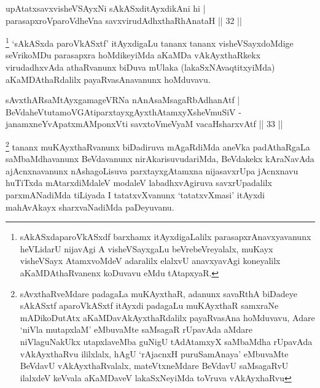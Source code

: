 
\begin{shl}
upAtatxsavxvisheVSAyxNi sAkASxditAyxdikAni hi |\\
parasapxroVparoVdheVna savxvirudAdhxthaRhAnataH \hfill || 32 ||
\end{shl}

\begin{artha}
\footnote[4]{sAkASxdaparoVkASxdf barxhamx itAyxdigaLalilx parasapxrAnavxyavanunx heVLidarU nijavAgi A visheVSayxgaLu beVrebeVreyalalx, muKayx visheVSayx AtamxvoMdeV adaralilx elalxvU anavxyavAgi koneyalilx aKaMDAthaRvanenx koDuvavu eMdu tAtapxyaR.} `sAkASxda paroVkASxtf' itAyxdigaLu tananx tananx visheVSayxdoMdige seVrikoMDu parasapxra hoMdikeyiMda aKaMDa vAkAyxthaRkekx virudadhxvAda athaRvanunx biDuva mUlaka (lakaSxNAvaqtitxyiMda) aKaMDAthaRdalilx payaRvasAnavanunx hoMduvavu.
\end{artha}


\begin{shl}
sAvxthARsaMtAyxgamageVRNa nAnAsaMsagaRbAdhanAtf |\\
BeVdaheVtutamoVGAtiparxtayxgAyxthAtamxyXsheVmuSiV -\\
 janamxneYvA\s \s patxmAMponxVti savxtoV\s meVyaM vacaHsharxvAtf \hfill || 33 || 
\end{shl}

\begin{artha}
\footnote[1]{sAvxthaRveMdare padagaLa muKAyxthaR, adanunx savaRthA biDadeye sAkASxtf aparoVkASxtf itAyxdi padagaLu muKAyxthaR samxraNe mADikoDutAtx aKaMDavAkAyxthaRdalilx payaRvasAna hoMduvavu, Adare `niVla mutapxlaM' eMbuvaMte saMsagaR rUpavAda aMdare niVlaguNakUkx utapxlaveMba guNigU tAdAtamxyX saMbaMdha rUpavAda vAkAyxthaRvu ililxlalx, hAgU `rAjacnxH puruSamAnaya' eMbuvaMte BeVdavU vAkAyxthaRvalalx, mateVtxneMdare BeVdavU saMsagaRvU ilalxdeV keVvala aKaMDaveV lakaSxNeyiMda toVruva vAkAyxhaRvu} tananx muKAyxthaRvanunx biDadiruva mAgaRdiMda aneVka padAthaRgaLa saMbaMdhavanunx BeVdavanunx nirAkarisuvudariMda, BeVdakekx kAraNavAda ajAcnxnavanunx nAshagoLisuva parxtayxgAtamxna nijasavxrUpa jAcnxnavu huTiTxda mAtarxdiMdaleV modaleV labadhxvAgiruva savxrUpadalilx parxmANadiMda tiLiyada I tatatxvXvanunx `tatatxvXmasi' itAyxdi mahAvAkayx sharxvaNadiMda paDeyuvanu.
\end{artha}

